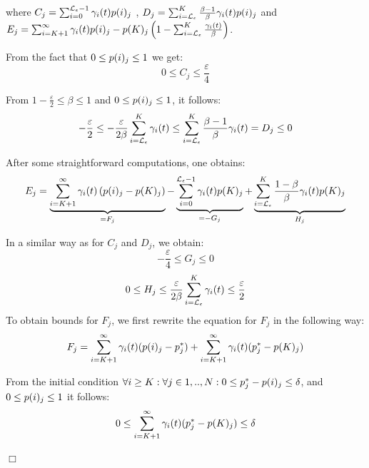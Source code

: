 \documentclass[a4paper,11pt]{article}
\newenvironment{proof}{\trivlist \item[\hskip \labelsep{\bf Proof}]}{\hfill\hbox{$\Box$}\endtrivlist}
\begin{document}
\begin{proof}
\begin{enumerate}
					where $C_{j} = \sum_{i=0}^{\mathcal{L}_{\epsilon}-1} \gamma_{i}(t) p(i)_{j}$ , $D_{j} = \sum_{i=\mathcal{L}_{\epsilon}}^{K} \frac{\beta - 1}{\beta} \gamma_{i}(t) p(i)_{j} $ and $E_{j} = \sum_{i=K+1}^{\infty}\gamma_{i}(t) p(i)_{j} - p(K)_{j} \left(1 - \sum_{i=\mathcal{L}_{\epsilon}}^{K}\frac{\gamma_{i}(t)}{\beta} \right)$.
					
					From the fact that $0 \leq p(i)_{j} \leq 1$ we get:
					\begin{equation}
						 0 \leq C_{j} \leq \frac{\varepsilon}{4} \nonumber
					\end{equation}
					
					From $1- \frac{\varepsilon}{2} \leq \beta \leq 1$ and $0 \leq p(i)_{j} \leq 1$, it follows:
					\begin{equation}
						 - \frac{\varepsilon}{2} \leq - \frac{\varepsilon}{2 \beta} \sum_{i=\mathcal{L}_{\epsilon}}^{K} \gamma_{i}(t) \leq \sum_{i=\mathcal{L}_{\epsilon}}^{K} \frac{\beta - 1}{\beta} \gamma_{i}(t) = D_{j} \leq 0 \nonumber
					\end{equation}
					
					After some straightforward computations, one obtains:
					\begin{equation}
						E_{j} = \underbrace{\sum_{i=K+1}^{\infty}\gamma_{i}(t) \left( p(i)_{j} - p(K)_{j} \right)}_{=F_{j}} - \underbrace{\sum_{i=0}^{\mathcal{L}_{\epsilon}-1}\gamma_{i}(t) p(K)_{j}}_{=-G_{j}} + \underbrace{\sum_{i=\mathcal{L}_{\epsilon}}^{K}\frac{1- \beta}{\beta} \gamma_{i}(t) p(K)_{j}}_{H_{j}} \label{eq:c_init}
					\end{equation}

					In a similar way as for $C_{j}$ and $D_{j}$, we obtain:
					\begin{equation}
						- \frac{\varepsilon}{4} \leq G_{j} \leq 0 \nonumber
					\end{equation}
					\begin{equation}
						 0 \leq H_{j} \leq \frac{\varepsilon}{2 \beta} \sum_{i=\mathcal{L}_{\epsilon}}^{K} \gamma_{i}(t) \leq \frac{\varepsilon}{2} \nonumber
					\end{equation}
						To obtain bounds for $F_{j}$, we first rewrite the equation for $F_{j}$ in the following way: 
					\begin{equation}
							F_{j} = \sum_{i=K+1}^{\infty}\gamma_{i}(t) (p(i)_{j} - p^{*}_{j}) + \sum_{i=K+1}^{\infty} \gamma_{i}(t) (p^{*}_{j} - p(K)_{j}) \nonumber
					 \end{equation}

					 From the initial condition $\forall i \geq K : \forall j \in 1,..,N : 0 \leq p^{*}_{j} - p(i)_{j} \leq \delta$, and $0 \leq p(i)_{j} \leq 1$ it follows:
					\begin{equation}
							0 \leq \sum_{i=K+1}^{\infty} \gamma_{i}(t) (p^{*}_{j} - p(K)_{j}) \leq \delta \nonumber
					 \end{equation}


\end{enumerate}
\end{proof}
\end{document}
